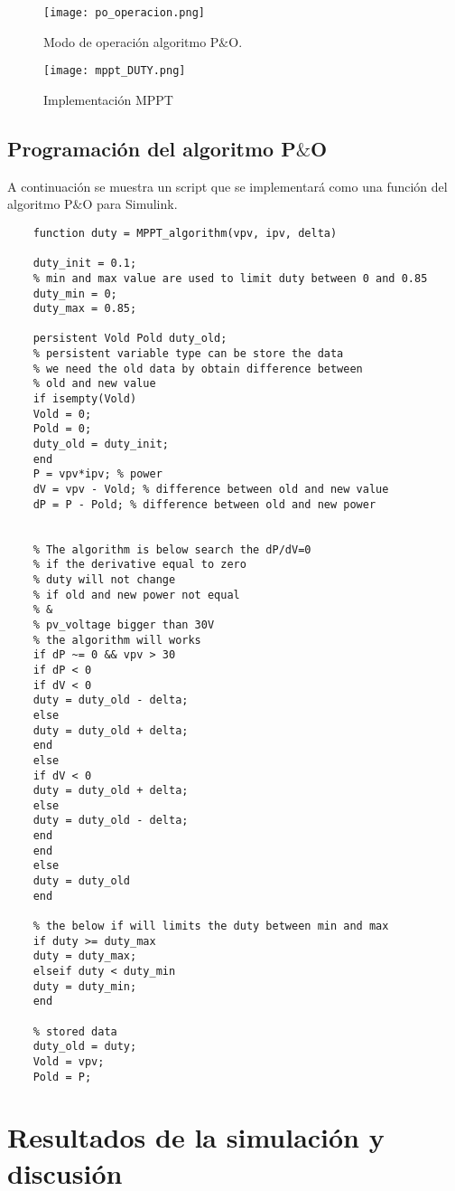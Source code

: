 \documentclass[10pt,twocolumn]{article}
\begin{document}
 \begin{figure}[h!]
	\centering
	\texttt{[image: po\_operacion.png]}
	\caption{Modo de operación algoritmo P$\&$O.}
	\label{po_operacion}
\end{figure}

 \begin{figure}[h!]
	\centering
	\texttt{[image: mppt\_DUTY.png]}
	\caption{Implementación MPPT}
	\label{MPPT}
\end{figure}


\subsection{Programación del algoritmo P$\&$O}

A continuación se muestra un script que se implementará como una función del algoritmo P$\&$O para Simulink.

\begin{lstlisting} 
	function duty = MPPT_algorithm(vpv, ipv, delta)
	
	duty_init = 0.1;
	% min and max value are used to limit duty between 0 and 0.85
	duty_min = 0;
	duty_max = 0.85;
	
	persistent Vold Pold duty_old;
	% persistent variable type can be store the data
	% we need the old data by obtain difference between
	% old and new value
	if isempty(Vold)
	Vold = 0;
	Pold = 0;
	duty_old = duty_init;
	end
	P = vpv*ipv; % power
	dV = vpv - Vold; % difference between old and new value
	dP = P - Pold; % difference between old and new power
	
	
	% The algorithm is below search the dP/dV=0
	% if the derivative equal to zero
	% duty will not change
	% if old and new power not equal
	% &
	% pv_voltage bigger than 30V
	% the algorithm will works
	if dP ~= 0 && vpv > 30
	if dP < 0
	if dV < 0
	duty = duty_old - delta;
	else
	duty = duty_old + delta;
	end
	else
	if dV < 0
	duty = duty_old + delta;
	else
	duty = duty_old - delta;
	end
	end
	else
	duty = duty_old
	end
	
	% the below if will limits the duty between min and max
	if duty >= duty_max
	duty = duty_max;
	elseif duty < duty_min
	duty = duty_min;
	end
	
	% stored data
	duty_old = duty;
	Vold = vpv;
	Pold = P;
\end{lstlisting}

\section{Resultados de la simulación y discusión}
\end{document}
